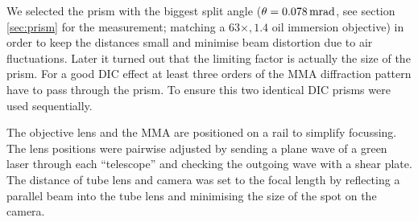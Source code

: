 We selected the prism with the biggest split angle
($\theta=\unit[0.078]{mrad}$, see section \ref{sec:prism} for the
measurement; matching a $63\times, 1.4$ oil immersion objective) in
order to keep the distances small and minimise beam distortion due to
air fluctuations. Later it turned out that the limiting factor is
actually the size of the prism. For a good DIC effect at least three
orders of the MMA diffraction pattern have to pass through the
prism. To ensure this two identical DIC prisms were used sequentially.

The objective lens and the MMA are positioned on a rail to simplify
focussing. The lens positions were pairwise adjusted by sending a
plane wave of a green laser through each ``telescope'' and checking
the outgoing wave with a shear plate. The distance of tube lens and
camera was set to the focal length by reflecting a parallel beam into
the tube lens and minimising the size of the spot on the camera.

